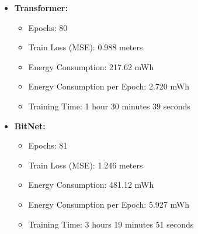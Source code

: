 \begin{itemize}
    \item \textbf{Transformer:} 
    \begin{itemize}
        \item Epochs: 80
        \item Train Loss (MSE): 0.988 meters
        \item Energy Consumption: 217.62 mWh
        \item Energy Consumption per Epoch: 2.720 mWh
        \item Training Time: 1 hour 30 minutes 39 seconds
    \end{itemize}
    
    \item \textbf{BitNet:} 
    \begin{itemize}
        \item Epochs: 81
        \item Train Loss (MSE): 1.246 meters
        \item Energy Consumption: 481.12 mWh
        \item Energy Consumption per Epoch: 5.927 mWh
        \item Training Time: 3 hours 19 minutes 51 seconds
    \end{itemize}
\end{itemize}
